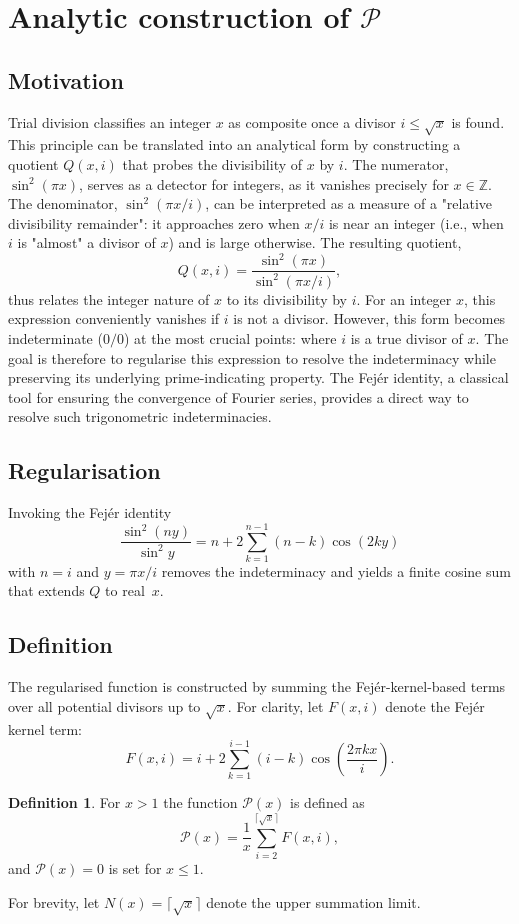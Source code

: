 \documentclass[11pt,a4paper]{amsart}
\newcommand{\Px}{\mathcal{P}}
\theoremstyle{plain}
\theoremstyle{definition}
\newtheorem{definition}[theorem]{Definition}
\begin{document}
\section{Analytic construction of $\Px$}

\subsection{Motivation}\label{subsec:motivation}
Trial division classifies an integer $x$ as composite once a divisor $i\le\sqrt{x}$ is found.
This principle can be translated into an analytical form by constructing a quotient $Q(x,i)$ that probes the divisibility of $x$ by $i$.
The numerator, $\sin^2(\pi x)$, serves as a detector for integers, as it vanishes precisely for $x \in \mathbb{Z}$.
The denominator, $\sin^2(\pi x/i)$, can be interpreted as a measure of a "relative divisibility remainder": it approaches zero when $x/i$ is near an integer (i.e., when $i$ is "almost" a divisor of $x$) and is large otherwise.
The resulting quotient,
\[
Q(x,i)=\frac{\sin^{2}(\pi x)}{\sin^{2}(\pi x/i)},
\]
thus relates the integer nature of $x$ to its divisibility by $i$.
For an integer $x$, this expression conveniently vanishes if $i$ is not a divisor.
However, this form becomes indeterminate ($0/0$) at the most crucial points: where $i$ is a true divisor of $x$.
The goal is therefore to regularise this expression to resolve the indeterminacy while preserving its underlying prime-indicating property.
The Fejér identity, a classical tool for ensuring the convergence of Fourier series, provides a direct way to resolve such trigonometric indeterminacies.
\subsection{Regularisation}
Invoking the Fejér identity
\[
\frac{\sin^{2}(ny)}{\sin^{2}y}=n+2\sum_{k=1}^{n-1}(n-k)\cos(2ky)
\]
with $n=i$ and $y=\pi x/i$ removes the indeterminacy and yields a finite cosine sum that extends $Q$ to real~$x$.
\subsection{Definition}
The regularised function is constructed by summing the Fejér-kernel-based terms over all potential divisors up to $\sqrt{x}$.
For clarity, let $F(x,i)$ denote the Fejér kernel term:
\begin{equation}\label{eq:Fxi}
F(x,i) = i+2\sum_{k=1}^{i-1}(i-k)\cos\left(\frac{2\pi k x}{i}\right).
\end{equation}
\begin{definition}\label{def:Px}
For $x>1$ the function $\Px(x)$ is defined as
\begin{equation}\label{eq:Px}
\Px(x)=\frac{1}{x}\sum_{i=2}^{\lceil\sqrt{x}\rceil} F(x,i),
\end{equation}
and $\Px(x)=0$ is set for $x\le1$.
\end{definition}
For brevity, let $N(x) = \lceil\sqrt{x}\rceil$ denote the upper summation limit.
\end{document}
